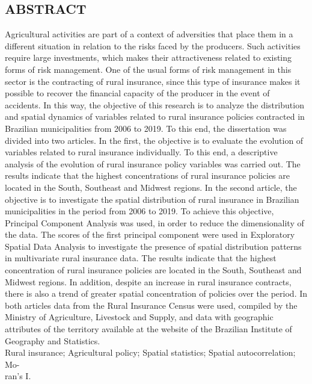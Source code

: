 
\newpage
\begin{singlespace}
\begin{center}
\section*{ABSTRACT}
\end{center}
Agricultural activities are part of a context of adversities that place them  in a different situation in relation to the risks faced by the producers. Such activities require large investments, which makes their attractiveness related to existing forms of risk management. One of the usual forms of risk management in this sector is the contracting of rural insurance, since this type of insurance makes it possible to recover the financial capacity of the producer in the event of accidents. In this way, the objective of this research is to analyze the distribution and spatial dynamics  of variables related to rural insurance policies contracted in Brazilian municipalities from 2006 to 2019. To this end, the dissertation was divided into two articles. In the first, the objective is to evaluate the evolution of variables related to rural insurance individually. To this end, a descriptive analysis of the evolution of rural insurance policy variables was carried out. The results indicate that the highest concentrations of rural insurance policies are located in the South, Southeast and Midwest regions. In the second article, the objective is to investigate the spatial distribution of rural insurance in Brazilian municipalities in the period from 2006 to 2019. To achieve this objective, Principal Component Analysis was used, in order to reduce the dimensionality of the data. The scores of the first principal component were used in Exploratory Spatial Data Analysis to investigate the presence of spatial distribution patterns in multivariate rural insurance data. The results indicate that the highest concentration of rural insurance policies are located in the South, Southeast and Midwest regions. In addition, despite an increase in rural insurance contracts, there is also a trend of greater spatial concentration of policies over  the period. In both articles data from the Rural Insurance Census were used, compiled by the Ministry of Agriculture, Livestock and Supply, and data with geographic attributes of the territory available at the website of the Brazilian Institute of Geography and Statistics.\\
\newline
{} Rural insurance; Agricultural policy; Spatial statistics; Spatial autocorrelation; Mo-\\
\hspace*{4.5em} ran’s I.

\end{singlespace}
